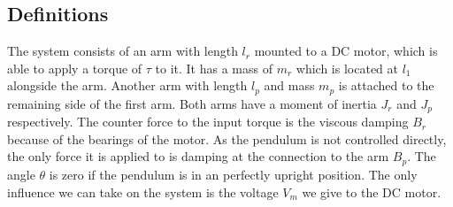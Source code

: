 \subsection{Definitions}
The system consists of an arm with length $l_r$ mounted to a DC motor, which is 
able to apply a torque of $\tau$ to it. It has a mass of $m_r$ which is 
located at $l_1$ alongside the arm. Another arm with length $l_p$ and mass 
$m_p$ %
is attached to the remaining side of the 
first arm. Both arms have a moment of inertia $J_r$ and $J_p$ respectively. The 
counter force to the input torque is the viscous damping $B_r$ because of the 
bearings of the motor. As the pendulum is not controlled directly, the only 
force it is applied to is damping at the connection to the arm $B_p$. The angle 
$\theta$ is zero if the pendulum is in an perfectly upright position.
The only influence we can take on the system is the voltage $V_m$ we give to 
the DC motor.
